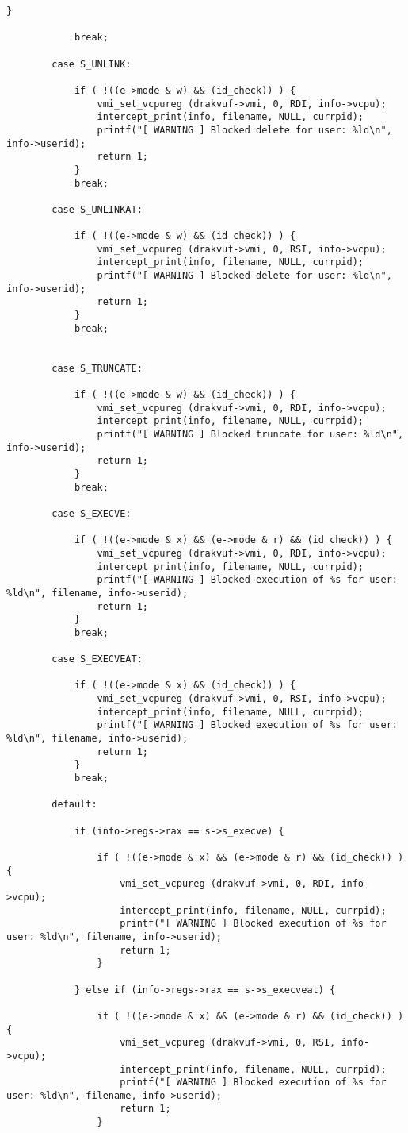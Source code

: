 {\begin{lstlisting}[style=CStyle]
			}
			
			break;
		
		case S_UNLINK:
		
			if ( !((e->mode & w) && (id_check)) ) {
				vmi_set_vcpureg (drakvuf->vmi, 0, RDI, info->vcpu);
				intercept_print(info, filename, NULL, currpid);
				printf("[ WARNING ] Blocked delete for user: %ld\n", info->userid);
				return 1;
			}
			break;
		
		case S_UNLINKAT:
		
			if ( !((e->mode & w) && (id_check)) ) {
				vmi_set_vcpureg (drakvuf->vmi, 0, RSI, info->vcpu);
				intercept_print(info, filename, NULL, currpid);
				printf("[ WARNING ] Blocked delete for user: %ld\n", info->userid);
				return 1;
			}
			break;
		
		
		case S_TRUNCATE:
		
			if ( !((e->mode & w) && (id_check)) ) {
				vmi_set_vcpureg (drakvuf->vmi, 0, RDI, info->vcpu);
				intercept_print(info, filename, NULL, currpid);
				printf("[ WARNING ] Blocked truncate for user: %ld\n", info->userid);
				return 1;
			}
			break;
		
		case S_EXECVE:
		
			if ( !((e->mode & x) && (e->mode & r) && (id_check)) ) {
				vmi_set_vcpureg (drakvuf->vmi, 0, RDI, info->vcpu);
				intercept_print(info, filename, NULL, currpid);
				printf("[ WARNING ] Blocked execution of %s for user: %ld\n", filename, info->userid);
				return 1;
			}
			break;
		
		case S_EXECVEAT:
		
			if ( !((e->mode & x) && (id_check)) ) {
				vmi_set_vcpureg (drakvuf->vmi, 0, RSI, info->vcpu);
				intercept_print(info, filename, NULL, currpid);
				printf("[ WARNING ] Blocked execution of %s for user: %ld\n", filename, info->userid);
				return 1;
			}
			break;
		
		default:
		
			if (info->regs->rax == s->s_execve) {
			
				if ( !((e->mode & x) && (e->mode & r) && (id_check)) ) {
					vmi_set_vcpureg (drakvuf->vmi, 0, RDI, info->vcpu);
					intercept_print(info, filename, NULL, currpid);
					printf("[ WARNING ] Blocked execution of %s for user: %ld\n", filename, info->userid);
					return 1;
				}
			
			} else if (info->regs->rax == s->s_execveat) {
			
				if ( !((e->mode & x) && (e->mode & r) && (id_check)) ) {
					vmi_set_vcpureg (drakvuf->vmi, 0, RSI, info->vcpu);
					intercept_print(info, filename, NULL, currpid);
					printf("[ WARNING ] Blocked execution of %s for user: %ld\n", filename, info->userid);
					return 1;
				}
			

\end{lstlisting}}
